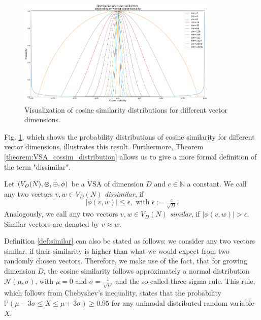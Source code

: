\begin{figure}[t!]
	\centering
	\includegraphics[width=0.85\textwidth]{imgs/distributions_cosine_sims.eps}
	\caption{Visualization of cosine similarity distributions for different vector dimensions.}
	\label{fig:cosine_dist}
\end{figure}
Fig. \ref{fig:cosine_dist}, which shows the probability distributions of cosine similarity for different vector dimensions, illustrates this result.
Furthermore, Theorem \ref{theorem:VSA_cossim_distribution} allows us to give a more formal definition of the term "dissimilar".
\begin{defn}
	\label{def:similar}
	Let $(V_{D}(N), \varoast, \oplus, \phi)$ be a \acrfull{VSA} of dimension $D$ and $c \in \mathbb{N}$ a constant. We call any two vectors $v, w \in V_{D}(N)$ \emph{dissimilar}, if
	\[
	\left| \phi(v,w) \right| \leq \epsilon, \textrm{ with } \epsilon:=\tfrac{c}{\sqrt{D}}.
	\]
	Analogously, we call any two vectors $v, w \in V_{D}(N)$ \emph{similar}, if	$\left| \phi(v,w) \right| > \epsilon$.
	Similar vectors are denoted by $v \approx w$. \\
\end{defn}
Definition \ref{def:similar} can also be stated as follows: we consider any two vectors similar, if their similarity is higher than what we would expect from two randomly chosen vectors.
Therefore, we make use of the fact, that for growing dimension $D$, the cosine similarity follows approximately a normal distribution $\mathcal{N}\left(\mu, \sigma\right)$, with $\mu=0$ and $\sigma=\tfrac{1}{\sqrt{D}}$ and the so-called three-sigma-rule.
This rule, which follows from Chebyshev's inequality, states that the probability $\mathbb{P}\left(\mu-3\sigma \leq X \leq \mu+3\sigma \right) \geq 0.95$ for any unimodal distributed random variable $X$.
